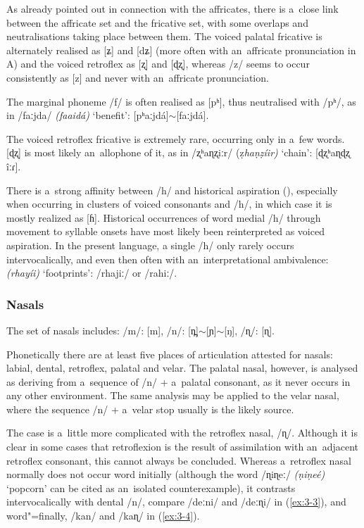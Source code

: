 As already pointed out in connection with the affricates, there is a~close link between the affricate set and the fricative set, with some overlaps and neutralisations taking place between them. The voiced palatal fricative is alternately realised as [ʑ] and [dʑ] (more often with an~affricate pronunciation in A) and the voiced retroflex as [ʐ] and [ɖʐ], whereas /z/ seems to occur consistently as [z] and never with an~affricate pronunciation.


The marginal phoneme /f/ is often realised as [pʰ], thus neutralised with /pʰ/, as in /faːjda/ \textit{(faaidá)} `benefit': [pʰaːjdá]$\sim$[faːjdá].


The voiced retroflex fricative is extremely rare, occurring only in a~few words. [ɖʐ] is most likely an~allophone of it, as in /ʐʰaɳʐiːr/ (ẓ\textit{haṇẓíir)} `chain': [ɖʐʰaɳɖʐ îːɾ]. 


There is a~strong affinity between /h/ and historical aspiration (), especially when occurring in clusters of voiced consonants and /h/, in which case it is mostly realized as [ɦ]. Historical occurrences of word medial /h/ through movement to syllable onsets have most likely been reinterpreted as voiced aspiration. In the present language, a single /h/ only rarely occurs intervocalically, and even then often with an~interpretational ambivalence: \textit{(rhayíi)} `footprints': /rhajiː/ or /rahiː/.


\subsubsection*{Nasals}

The set of nasals includes: /m/: [m], /n/: [n̪]$\sim${}[ɲ]$\sim$[ŋ], /ɳ/: [ɳ].


Phonetically there are at least five places of articulation attested for nasals: labial, dental, retroflex, palatal and velar. The palatal nasal, however, is analysed as deriving from a~sequence of /n/ + a~palatal consonant, as it never occurs in any other environment. The same analysis may be applied to the velar nasal, where the sequence /n/ + a~velar stop usually is the likely source.


The case is a~little more complicated with the retroflex nasal, /ɳ/. Although it is clear in some cases that retroflexion is the result of assimilation with an~adjacent retroflex consonant, this cannot always be concluded. Whereas a~retroflex nasal normally does not occur word initially (although the word /ɳiɳeː/ \textit{(ṇiṇeé)} `popcorn' can be cited as an~isolated counterexample), it contrasts intervocalically with dental /n/, compare /deːni/ and /deːɳi/ in (\ref{ex:3-3}), and word"=finally, /kan/ and /kaɳ/ in (\ref{ex:3-4}). 

